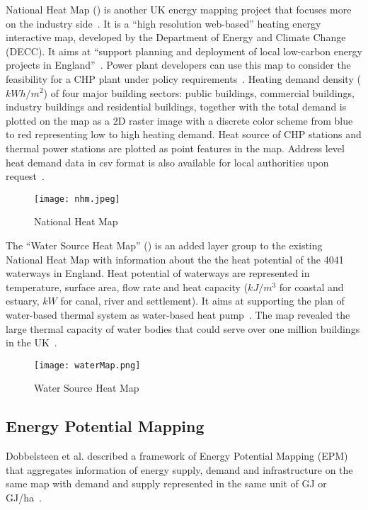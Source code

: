 National Heat Map () is another UK energy mapping
project that focuses more on the industry
side~\cite{decentralHeatMap2011}. It is a ``high resolution
web-based'' heating energy interactive map, developed by the
Department of Energy and Climate Change (DECC). It aims at ``support
planning and deployment of local low-carbon energy projects in
England''~\cite{heatMap2015}. Power plant developers can use this map
to consider the feasibility for a CHP plant under policy
requirements~\cite{decentralHeatMap2011}. Heating demand density
($kWh/m^2$) of four major building sectors: public buildings,
commercial buildings, industry buildings and residential buildings,
together with the total demand is plotted on the map as a 2D raster
image with a discrete color scheme from blue to red representing low
to high heating demand. Heat source of CHP stations and thermal power
stations are plotted as point features in the map. Address level heat
demand data in csv format is also available for local authorities upon
request~\cite{heatMapLocal2012}.

\begin{figure}[h!]
  \centering
  \texttt{[image: nhm.jpeg]}
  \caption[National Heat Map]{National Heat Map~\cite{heatMap2012}}
  \label{fig:nhm}
\end{figure}

The ``Water Source Heat Map'' () is an added layer
group to the existing National Heat Map with information about the the
heat potential of the 4041 waterways in England. Heat potential of
waterways are represented in temperature, surface area, flow rate and
heat capacity ($kJ/m^3$ for coastal and estuary, $kW$ for canal, river
and settlement). It aims at supporting the plan of water-based thermal
system as water-based heat pump~\cite{waterHeatMap}. The map revealed
the large thermal capacity of water bodies that could serve over one
million buildings in the UK~\cite{waterHeatMap}.

\begin{figure}[h!]
  \centering
  \texttt{[image: waterMap.png]}
  \caption[Water Heat Map]{Water Source Heat Map~\cite{waterHeatMap}}
  \label{fig:waterMap}
\end{figure}

\subsection{Energy Potential Mapping}
Dobbelsteen et al. described a framework of Energy Potential Mapping
(EPM) that aggregates information of energy supply, demand and
infrastructure on the same map with demand and supply represented in
the same unit of GJ or GJ/ha~\cite{Dobbelsteen2013}.

